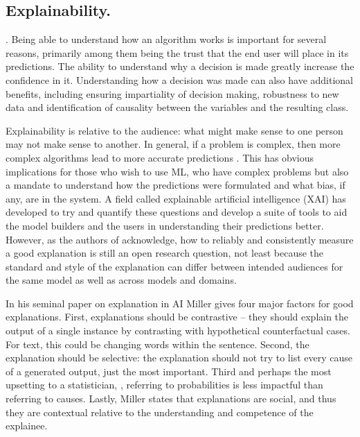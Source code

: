 \subsection{Explainability.}   \parencite{arrieta2020explainable}. Being able to understand how an algorithm works is important for several reasons, primarily among them being the trust that the end user will place in its predictions. The ability to understand why a decision is made greatly increase the confidence in it. Understanding how a decision was made can also have additional benefits, including ensuring impartiality of decision making, robustness to new data and identification of causality between the variables and the resulting class.

Explainability is relative to the audience: what might make sense to one person may not make sense to another. In general, if a problem is complex, then more complex algorithms lead to more accurate predictions  \parencite{arrieta2020explainable}. This has obvious implications for those who wish to use ML, who have complex problems but also a mandate to understand how the predictions were formulated and what bias, if any, are in the system. A field called explainable artificial intelligence (XAI)  \parencite{gunning2019xai} has developed to try and quantify these questions and develop a suite of tools to aid the model builders and the users in understanding their predictions better. However, as the authors of  \parencite{gunning2019xai}  acknowledge, how to reliably and consistently measure a good explanation is still an open research question, not least because the standard and style of the explanation can differ between intended audiences for the same model as well as across models and domains.

In his seminal paper on explanation in AI \parencite{miller2019explanation} Miller gives four major factors for good explanations. First, explanations should be contrastive – they should explain the output of a single instance by contrasting with hypothetical counterfactual cases. For text, this could be changing words within the sentence. Second, the explanation should be selective: the explanation should not try to list every cause of a generated output, just the most important. Third and perhaps the most upsetting to a statistician,   , referring to probabilities is less impactful than referring to causes. Lastly, Miller states that explanations are social, and thus they are contextual relative to the understanding and competence of the explainee.

